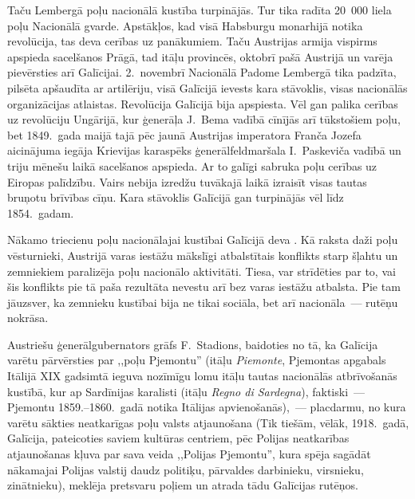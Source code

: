 \documentclass[twoside,a5paper,12pt,fleqn,openany]{extbook}
\newcommand{\ittxti}[1]{\textit{\textitalian{#1}}}
\begin{document}
Taču Lembergā poļu nacionālā kustība turpinājās. Tur tika radīta 20~000 liela poļu Nacionālā gvarde. Apstākļos, kad visā Habsburgu monarhijā notika revolūcija, tas deva cerības uz panākumiem. Taču Austrijas armija vispirms apspieda sacelšanos Prāgā, tad itāļu provincēs, oktobrī pašā Austrijā un varēja pievērsties arī Galīcijai. 2.~novembrī Nacionālā Padome Lembergā tika padzīta, pilsēta apšaudīta ar artilēriju, visā Galīcijā ievests kara stāvoklis, visas nacionālās organizācijas atlaistas. Revolūcija Galīcijā bija apspiesta. Vēl gan palika cerības uz revolūciju Ungārijā, kur ģenerāļa J.~Bema vadībā cīnījās arī tūkstošiem poļu, bet 1849.~gada maijā tajā pēc jaunā Austrijas imperatora Franča Jozefa aicinājuma iegāja Krievijas karaspēks ģenerālfeldmaršala I.~Paskeviča vadībā un triju mēnešu laikā sacelšanos apspieda. Ar to galīgi sabruka poļu cerības uz Eiropas palīdzību. Vairs nebija izredžu tuvākajā laikā izraisīt visas tautas bruņotu brīvības cīņu. Kara stāvoklis Galīcijā gan turpinājās vēl līdz 1854.~gadam.

Nākamo triecienu poļu nacionālajai kustībai Galīcijā deva . Kā raksta daži poļu vēsturnieki, Austrijā varas iestāžu mākslīgi atbalstītais konflikts starp šļahtu un zemniekiem paralizēja poļu nacionālo aktivitāti. Tiesa, var strīdēties par to, vai šis konflikts pie tā paša rezultāta nevestu arī bez varas iestāžu atbalsta. Pie tam jāuzsver, ka zemnieku kustībai bija ne tikai sociāla, bet arī nacionāla~--- rutēņu nokrāsa.

Austriešu ģenerālgubernators grāfs F.~Stadions, baidoties no tā, ka Galīcija varētu pārvērsties par ,,poļu Pjemontu'' (itāļu \ittxti{Piemonte}, Pjemontas apgabals Itālijā XIX gadsimtā ieguva nozīmīgu lomu itāļu tautas nacionālās atbrīvošanās kustībā, kur ap Sardīnijas karalisti (itāļu \ittxti{Regno di Sardegna}), faktiski~--- Pjemontu 1859.--1860.~gadā notika Itālijas apvienošanās),~--- placdarmu, no kura varētu sākties neatkarīgas poļu valsts atjaunošana (Tik tiešām, vēlāk, 1918.~gadā, Galīcija, pateicoties saviem kultūras centriem, pēc Polijas neatkarības atjaunošanas kļuva par sava veida ,,Polijas Pjemontu'', kura spēja sagādāt nākamajai Polijas valstij daudz politiķu, pārvaldes darbinieku, virsnieku, zinātnieku), meklēja pretsvaru poļiem un atrada tādu Galīcijas rutēņos.
\end{document}
